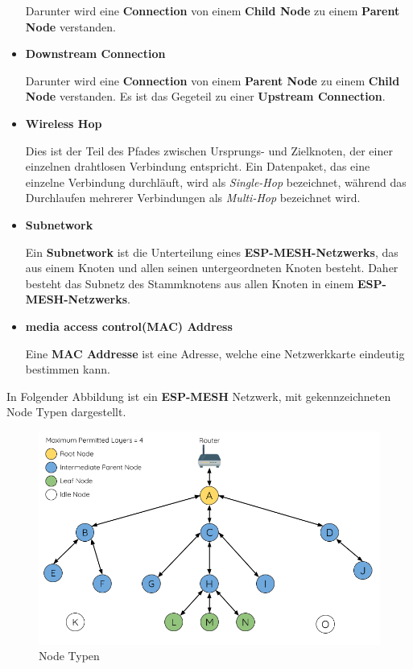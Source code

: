 \begin{itemize}
    Darunter wird eine \textbf{Connection} von einem \textbf{Child Node} zu einem \textbf{Parent Node} verstanden.

    \item \textbf{Downstream Connection}
    
    Darunter wird eine \textbf{Connection} von einem \textbf{Parent Node} zu einem \textbf{Child Node} verstanden. Es ist das Gegeteil zu einer \textbf{Upstream Connection}.

    \pagebreak

    \item \textbf{Wireless Hop}
    
    Dies ist der Teil des Pfades zwischen Ursprungs- und Zielknoten, der einer einzelnen drahtlosen Verbindung entspricht. Ein Datenpaket, das eine einzelne Verbindung durchläuft, wird als \textit{Single-Hop} bezeichnet, während das Durchlaufen mehrerer Verbindungen als \textit{Multi-Hop} bezeichnet wird.
    
    \item \textbf{Subnetwork}
    
    Ein \textbf{Subnetwork} ist die Unterteilung eines \textbf{ESP-MESH-Netzwerks}, das aus einem Knoten und allen seinen untergeordneten Knoten besteht. Daher besteht das Subnetz des Stammknotens aus allen Knoten in einem \textbf{ESP-MESH-Netzwerks}.

    \item \textbf{media access control(MAC) Address}
    
    Eine \textbf{MAC Addresse} ist eine Adresse, welche eine Netzwerkkarte eindeutig bestimmen kann.
\end{itemize}

In Folgender Abbildung ist ein \textbf{ESP-MESH} Netzwerk, mit gekennzeichneten Node Typen dargestellt.

\begin{figure}[H] \begin{center}
    \includegraphics[scale=0.5]{diagrams/mesh-node-types.png}
    \caption{Node Typen \cite{esp-mesh}}
    \end{center}    
\end{figure}

